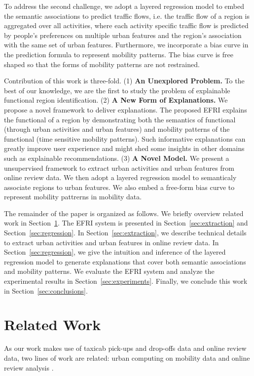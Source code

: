 \documentclass[runningheads]{llncs}
\begin{document}
To address the second challenge, we adopt a layered regression model to embed the semantic associations to predict traffic flows, i.e. the traffic flow of a region is aggregated over all activities, where each activity specific traffic flow is predicted by people's preferences on multiple urban features and the region's association with the same set of urban features.
Furthermore, we incorporate a bias curve in the prediction formula to represent mobility patterns. 
The bias curve is free shaped so that the forms of mobility patterns are not restrained.

Contribution of this work is three-fold. (1) \textbf{An Unexplored Problem.} To the best of our knowledge, we are the first to study the problem of explainable functional region identification. (2) \textbf{A New Form of Explanations.} We propose a novel framework to deliver explanations. The proposed EFRI explains the functional of a region by demonstrating both the semantics of functional (through urban activities and urban features) and mobility patterns of the functional (time sensitive mobility patterns). Such informative explanations can greatly improve user experience and might shed some insights in other domains such as explainable recommendations. (3) \textbf{A Novel Model.} We present a unsupervised framework to extract urban activities and urban features from online review data. We then adopt a layered regression model to semanticaly associate regions to urban features. We also embed a free-form bias curve to represent mobility pattrerns in mobility data.   

The remainder of the paper is organized as follows.
We briefly overview related work in Section~\ref{sec:related}.
The EFRI system is presented in Section~\ref{sec:extraction} and Section~\ref{sec:regression}. 
In Section~\ref{sec:extraction}, we describe technical details to extract urban activities and urban features in online review data.
In Section~\ref{sec:regression}, we give the intuition and inference of the layered regression model to generate explanations that cover both semantic associations and mobility patterns.
We evaluate the EFRI system and analyze the experimental results in Section~\ref{sec:experiments}.
Finally, we conclude this work in Section~\ref{sec:conclusions}.

\section{Related Work}\label{sec:related}
As our work makes use of taxicab pick-ups and drop-offs data and online review data, two lines of work are related: urban computing on mobility data and online review analysis .
\end{document}
